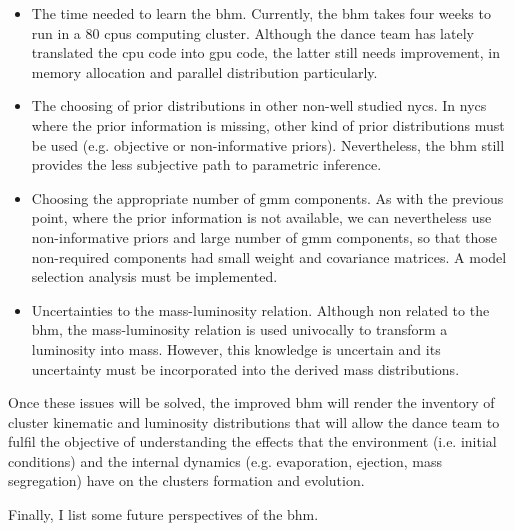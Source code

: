 \begin{itemize}
\begin{itemize}
\item The white dwarfs population. Although their numbers are negligible on \gls{nyc}, their mass contribution nevertheless must be considered to properly constrain the \gls{pdsmd} and the \glspl{imf}. 
\end{itemize}
\item The time needed to learn the \gls{bhm}. Currently, the \gls{bhm} takes four weeks to run in a 80 \glspl{cpu} computing cluster. Although the \gls{dance} team has lately translated the \gls{cpu} code into \gls{gpu} code, the latter still needs improvement, in memory allocation and parallel distribution particularly.
\item The choosing of prior distributions in other non-well studied \glspl{nyc}. In \glspl{nyc} where the prior information is missing, other kind of prior distributions must be used (e.g. objective or non-informative priors). Nevertheless, the \gls{bhm} still provides the less subjective path to parametric inference.
\item Choosing the appropriate number of \gls{gmm} components. As with the previous point, where the prior information is not available, we can nevertheless use non-informative priors and large number of \gls{gmm} components, so that those non-required components had small weight and covariance matrices. A model selection analysis must be implemented.
\item Uncertainties to the mass-luminosity relation. Although non related to the \gls{bhm}, the mass-luminosity relation is used univocally to transform a luminosity into mass. However, this knowledge is uncertain and its uncertainty must be incorporated into the derived mass distributions.
\end{itemize}

Once these issues will be solved, the improved \gls{bhm} will render the inventory of cluster kinematic and luminosity distributions that will allow the \gls{dance} team to fulfil the objective of understanding the effects that the environment (i.e. initial conditions) and the internal dynamics (e.g. evaporation, ejection, mass segregation) have on the clusters formation and evolution.

Finally, I  list some future perspectives of the \gls{bhm}.

